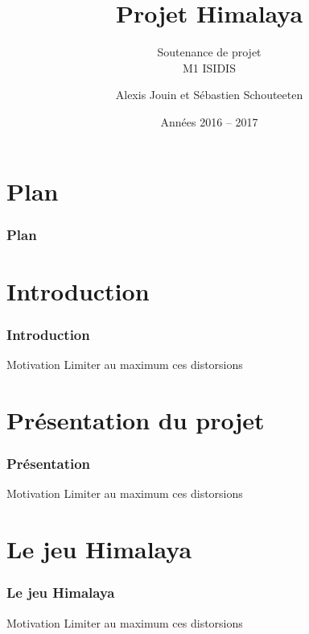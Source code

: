 \documentclass{beamer}
\begin{document}
	\title{\textbf{Projet Himalaya}}
	\subtitle{Soutenance de projet\\
		{\footnotesize M1 ISIDIS}}
	\author {Alexis Jouin et Sébastien Schouteeten}
	\date{Années 2016 -- 2017}
	\frame[plain]{
		\titlepage
	}
	
	
	\section*{Plan}
	\begin{frame} 
		\frametitle{Plan}
		\tableofcontents
	\end{frame}

	\section{Introduction}
	\begin{frame}
		\frametitle{Introduction}
		\begin{block}{Motivation}
			Limiter au maximum ces distorsions
		\end{block}
	\end{frame}

	\section{Présentation du projet}
	\begin{frame}
		\frametitle{Présentation}
		\begin{block}{Motivation}
			Limiter au maximum ces distorsions
		\end{block}	
	\end{frame}
	
	\section{Le jeu Himalaya}
	\begin{frame}
		\frametitle{Le jeu Himalaya}
		\begin{block}{Motivation}
			Limiter au maximum ces distorsions
		\end{block}	
	\end{frame}
	
\end{document}

